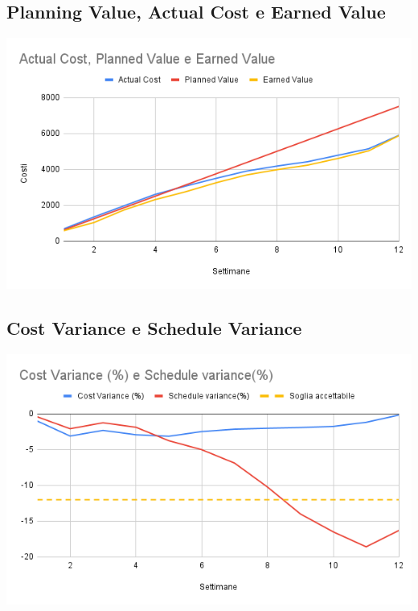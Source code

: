 \documentclass[12pt]{article}
\begin{document}
\subsection{Planning Value, Actual Cost e Earned Value}
\begin{center}
	\includegraphics[scale=0.5]{AC_PV_EV.png}
\end{center}
\subsection{Cost Variance e Schedule Variance}
\begin{center}
	\includegraphics[scale=0.5]{Cost_Variance_Schedule_Variance.png}
\end{center}
\end{document}
